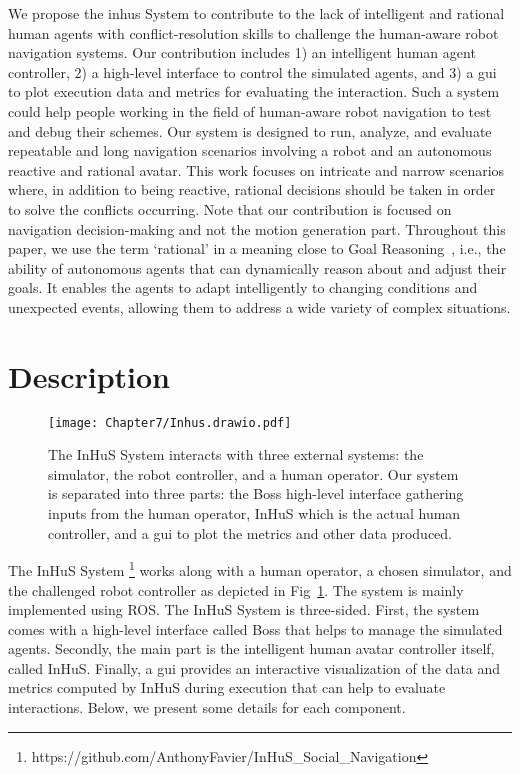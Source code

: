 We propose the \acrfull{inhus} System to contribute to the lack of intelligent and rational human agents with conflict-resolution skills to challenge the human-aware robot navigation systems. Our contribution includes 1) an intelligent human agent controller, 2) a high-level interface to control the simulated agents, and 3) a \acrfull{gui} to plot execution data and metrics for evaluating the interaction. Such a system could help people working in the field of human-aware robot navigation to test and debug their schemes. Our system is designed to run, analyze, and evaluate repeatable and long navigation scenarios involving a robot and an autonomous reactive and rational avatar. This work focuses on intricate and narrow scenarios where, in addition to being reactive, rational decisions should be taken in order to solve the conflicts occurring. Note that our contribution is focused on navigation decision-making and not the motion generation part. Throughout this paper, we use the term `rational' in a meaning close to Goal Reasoning~\cite{vattam_breadth_nodate,abbass_goal_2018}, i.e., the ability of autonomous agents that can dynamically reason about and adjust their goals. It enables the agents to adapt intelligently to changing conditions and unexpected events, allowing them to address a wide variety of complex situations.


\section{Description}
 
\begin{figure}[ht]
    \centering
    \texttt{[image: Chapter7/Inhus.drawio.pdf]}
    \caption{
    The InHuS System interacts with three external systems: the simulator, the robot controller, and a human operator. Our system is separated into three parts: the Boss high-level interface gathering inputs from the human operator, InHuS which is the actual human controller, and a \acrshort{gui} to plot the metrics and other data produced.
    }
    \label{fig:overview_inhus}
    \vspace{-0.8cm}
\end{figure}

The InHuS System%
\footnote{https://github.com/AnthonyFavier/InHuS\_Social\_Navigation}
works along with a human operator, a chosen simulator, and the challenged robot controller as depicted in Fig~\ref{fig:overview_inhus}. The system is mainly implemented using ROS. The InHuS  System is three-sided. First, the system comes with a high-level interface called Boss that helps to manage the simulated agents. Secondly, the main part is the intelligent human avatar controller itself, called InHuS.
Finally, a \acrshort{gui} provides an interactive visualization of the data and metrics computed by InHuS during execution that can help to evaluate interactions. Below, we present some details for each component.


